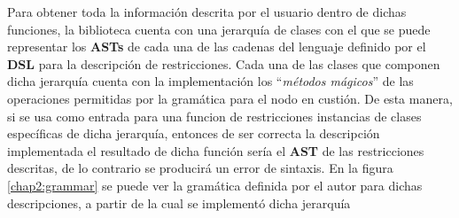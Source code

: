 Para obtener toda la información descrita por el usuario dentro de dichas funciones, la biblioteca cuenta con
una jerarquía de clases con el que se puede representar los {\bf ASTs} de cada una de las cadenas del lenguaje definido
por el {\bf DSL} para la descripción de restricciones. Cada una de las clases que componen dicha jerarquía cuenta con
la implementación los ``{\it métodos mágicos}'' de las operaciones permitidas por la gramática para el nodo en custión. De esta manera,
si se usa como entrada para una funcion de restricciones instancias de clases específicas de dicha jerarquía,
entonces de ser correcta la descripción implementada el resultado de dicha función sería el {\bf AST} de las restricciones
descritas, de lo contrario se producirá un error de sintaxis. En la figura \ref{chap2:grammar} se puede ver la gramática definida por
el autor para dichas descripciones, a partir de la cual se implementó dicha jerarquía



